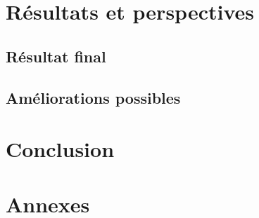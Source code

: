 \documentclass[french]{article}
\begin{document}
\newpage

\section{Résultats et perspectives}
\subsection{Résultat final}
\subsection{Améliorations possibles}

\newpage

\section{Conclusion}

\newpage

\section{Annexes}
\end{document}
